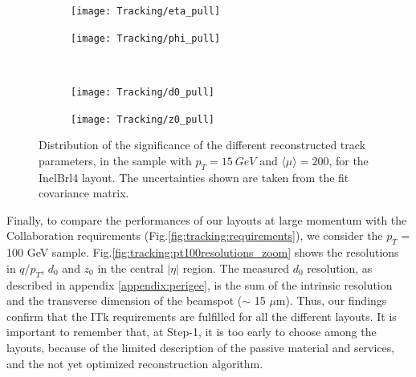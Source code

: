 \documentclass[a4paper,twoside,12pt]{book}
\begin{document}
\begin{figure}
\begin{subfigure}{.5\linewidth}
\texttt{[image: Tracking/eta\_pull]}
\caption{}
\label{fig:tracking:eta_pull}
\end{subfigure}
\begin{subfigure}{.5\linewidth}
\texttt{[image: Tracking/phi\_pull]}
\caption{}
\label{fig:tracking:phi_pull}
\end{subfigure}\\[1ex]
\begin{subfigure}{.5\linewidth}
\texttt{[image: Tracking/d0\_pull]}
\caption{}
\label{fig:tracking:d0_pull}
\end{subfigure}
\begin{subfigure}{.5\linewidth}
\texttt{[image: Tracking/z0\_pull]}
\caption{}
\label{fig:tracking:z0_pull}
\end{subfigure}

\caption{Distribution of the significance of the different reconstructed track parameters, in the sample with $p_{T} = 15\ GeV$ and $\langle\mu\rangle = 200$, for the InclBrl4 layout. The
uncertainties shown are taken from the fit covariance matrix.}
\label{fig:tracking:pull}
\end{figure}

Finally, to compare the performances of our layouts at large momentum with the Collaboration requirements (Fig.\ref{fig:tracking:requirements}), we consider the $p_{T}$ = 100 GeV sample.
Fig.\ref{fig:tracking:pt100resolutions_zoom} shows the resolutions in $q/p_{T}$, $d_{0}$ and $z_{0}$ in the central
$|\eta|$ region. The measured $d_{0}$ resolution, as described in appendix \ref{appendix:perigee}, is the sum of the intrinsic resolution and the transverse dimension of the beamspot ($\sim$ 15 $\mu$m). Thus, our findings confirm that the ITk requirements are fulfilled for all the different layouts. It is important to remember that, at Step-1, it is too early to choose among the
layouts, because of the limited description of the passive material and services, and the not yet optimized reconstruction algorithm. \\
\end{document}

